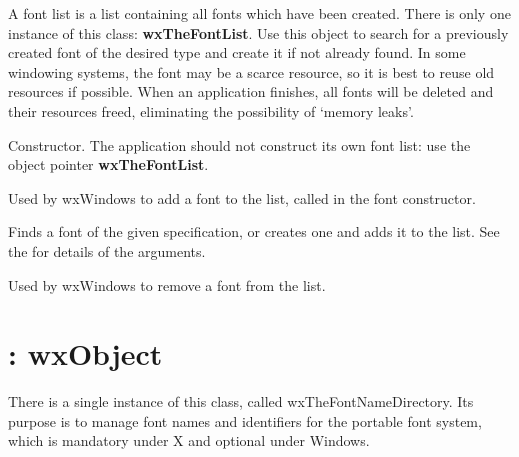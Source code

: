 A font list is a list containing all fonts which have been created. There
is only one instance of this class: {\bf wxTheFontList}.  Use this object to search
for a previously created font of the desired type and create it if not already found.
In some windowing systems, the font may be a scarce resource, so it is best to
reuse old resources if possible.  When an application finishes, all fonts will be
deleted and their resources freed, eliminating the possibility of `memory leaks'.



Constructor.  The application should not construct its own font list:
use the object pointer {\bf wxTheFontList}.



Used by wxWindows to add a font to the list, called in the font constructor.

\label{findorcreatefont}


Finds a font of the given specification, or creates one and adds it to the list. See the  for
details of the arguments.



Used by wxWindows to remove a font from the list.


\section{: wxObject}\label{wxfontnamedirectory}


There is a single instance of this class, called wxTheFontNameDirectory.
Its purpose is to manage font names and identifiers for the portable font
system, which is mandatory under X and optional under Windows.



